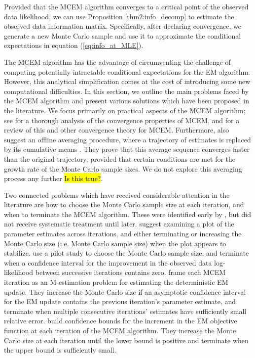 \documentclass[11pt, oneside]{article}   	%
\begin{document}
Provided that the MCEM algorithm converges to a critical point of the observed data likelihood, we can use Proposition \ref{thm2:info_decomp} to estimate the observed data information matrix. Specifically, after declaring convergence, we generate a new Monte Carlo sample and use it to approximate the conditional expectations in equation (\ref{eq:info_at_MLE}).

The MCEM algorithm has the advantage of circumventing the challenge of computing potentially intractable conditional expectations for the EM algorithm. However, this analytical simplification comes at the cost of introducing some new computational difficulties. In this section, we outline the main problems faced by the MCEM algorithm and present various solutions which have been proposed in the literature. We focus primarily on practical aspects of the MCEM algorithm; see \citet{For03} for a thorough analysis of the convergence properties of MCEM, and \citet{Nea13} for a review of this and other convergence theory for MCEM. Furthermore, \citet{For03} also suggest an offline averaging procedure, where a trajectory of estimates is replaced by its cumulative means \citep[see also Section 11.1.2.2 of][]{Cap05}. They prove that this average sequence converges faster than the original trajectory, provided that certain conditions are met for the growth rate of the Monte Carlo sample sizes. We do not explore this averaging process any further \hl{Is this true?}.

Two connected problems which have received considerable attention in the literature are how to choose the Monte Carlo sample size at each iteration, and when to terminate the MCEM algorithm. These were identified early by \citet{Wei90}, but did not receive systematic treatment until later. \citet{Wei90} suggest examining a plot of the parameter estimates across iterations, and either terminating or increasing the Monte Carlo size (i.e. Monte Carlo sample size) when the plot appears to stabilize. \citet{Cha95} use a pilot study to choose the Monte Carlo sample size, and terminate when a confidence interval for the improvement in the observed data log-likelihood between successive iterations contains zero. \citet{Boo99} frame each MCEM iteration as an M-estimation problem for estimating the deterministic EM update. They increase the Monte Carlo size if an asymptotic confidence interval for the EM update contains the previous iteration's parameter estimate, and terminate when multiple consecutive iterations' estimates have sufficiently small relative error. \citet{Caf05} build confidence bounds for the increment in the EM objective function at each iteration of the MCEM algorithm. They increase the Monte Carlo size at each iteration until the lower bound is positive and terminate when the upper bound is sufficiently small.
\end{document}
